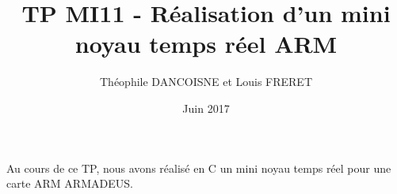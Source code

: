\documentclass{article}
\title{TP MI11 - Réalisation d’un mini noyau temps réel ARM}
\author{Théophile DANCOISNE et Louis FRERET}
\date{Juin 2017}
\begin{document}
\maketitle

Au cours de ce TP, nous avons réalisé en C un mini noyau temps réel pour une carte ARM ARMADEUS.




\end{document}
